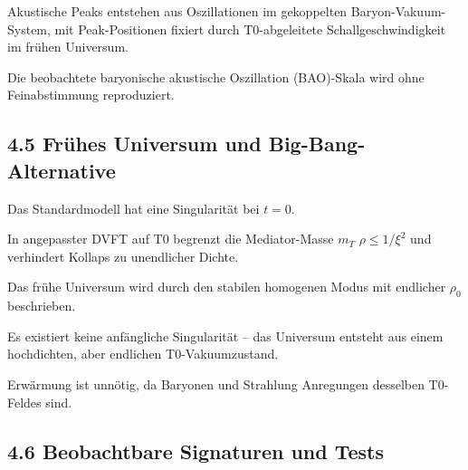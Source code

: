 \documentclass[12pt,a4paper]{article}
\begin{document}
	Akustische Peaks entstehen aus Oszillationen im gekoppelten Baryon-Vakuum-System, mit Peak-Positionen fixiert durch T0-abgeleitete Schallgeschwindigkeit im frühen Universum.
	
	Die beobachtete baryonische akustische Oszillation (BAO)-Skala wird ohne Feinabstimmung reproduziert.
	
	\subsection{4.5 Frühes Universum und Big-Bang-Alternative}
	
	Das Standardmodell hat eine Singularität bei $t=0$.
	
	In angepasster DVFT auf T0 begrenzt die Mediator-Masse $m_T$ $\rho \leq 1/\xi^2$ und verhindert Kollaps zu unendlicher Dichte.
	
	Das frühe Universum wird durch den stabilen homogenen Modus mit endlicher $\rho_0$ beschrieben.
	
	Es existiert keine anfängliche Singularität – das Universum entsteht aus einem hochdichten, aber endlichen T0-Vakuumzustand.
	
	Erwärmung ist unnötig, da Baryonen und Strahlung Anregungen desselben T0-Feldes sind.
	
	\subsection{4.6 Beobachtbare Signaturen und Tests}
	
	\begin{table}[htbp]
		\centering
		\caption{Kosmologische Vorhersagen-Vergleich}
		\label{tab:kosmo}
	\end{table}
	
\end{document}
